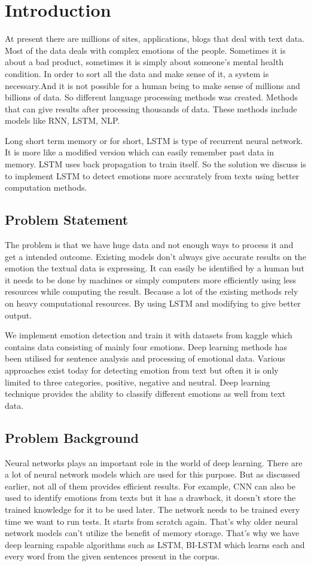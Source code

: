 \chapter{Introduction}\label{intro}
 At present there are millions of sites, applications, blogs that deal with text data. Most of the data deals with complex emotions of the people. Sometimes it is about a bad product, sometimes it is simply about someone's mental health condition. In order to sort all the data and make sense of it, a system is necessary.And it is not possible for a human being to make sense of millions and billions of data. So different language processing methods was created. Methods that can give results after processing thousands of data. These methods include models like RNN, LSTM, NLP.

Long short term memory or for short, LSTM is type of recurrent neural network. It is more like a modified version which can easily remember past data in memory. LSTM uses back propagation to train itself. So the solution we discuss is to implement LSTM to detect emotions more accurately from texts using better computation methods. 

\section{Problem Statement}
The problem is that we have huge data and not enough ways to process it and get a intended outcome. Existing models don't always give accurate results on the emotion the textual data is expressing. It can easily be identified by a human but it needs to be done by machines or simply computers more efficiently using less resources while computing the result. Because a lot of the existing methods rely on heavy computational resources. By using LSTM and modifying to give better output. 

We implement emotion detection and train it with datasets from kaggle which contains data consisting of mainly four emotions. Deep learning methods has been utilised for sentence analysis and processing of emotional data. Various approaches exist today for detecting emotion from text but often it is only limited to three categories, positive, negative and neutral. Deep learning technique provides the ability to classify different emotions as well from text data.
\section{Problem Background}
Neural networks plays an important role in the world of deep learning. There are a lot of neural network models which are used for this purpose. But as discussed earlier, not all of them provides efficient results. For example, CNN can also be used to identify emotions from texts but it has a drawback, it doesn't store the trained knowledge for it to be used later. The network needs to be trained every time we want to run tests. It starts from scratch again. That's why older neural network models can't utilize the benefit of memory storage. That's why we have deep learning capable algorithms such as LSTM, BI-LSTM which learns each and every word from the given sentences present in the corpus.   

